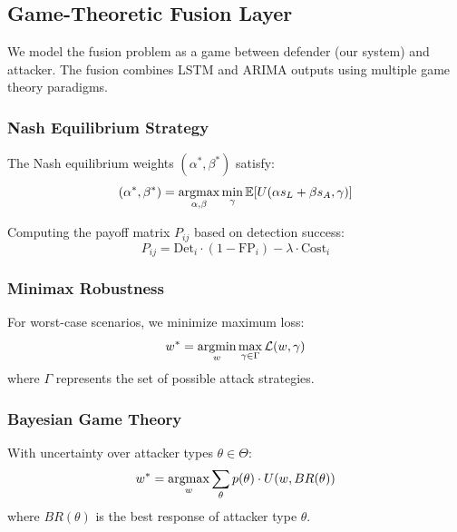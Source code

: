 \documentclass[10pt,conference]{IEEEtran}
\newcommand{\argmax}{\operatornamewithlimits{argmax}}
\newcommand{\argmin}{\operatornamewithlimits{argmin}}
\begin{document}
\subsection{Game-Theoretic Fusion Layer}

We model the fusion problem as a game between defender (our system) and attacker. The fusion combines LSTM and ARIMA outputs using multiple game theory paradigms.

\subsubsection{Nash Equilibrium Strategy}

The Nash equilibrium weights $(\alpha^*, \beta^*)$ satisfy:
\begin{equation}
(\alpha^*, \beta^*) = \argmax_{\alpha,\beta} \min_{\gamma} \mathbb{E}[U(\alpha s_L + \beta s_A, \gamma)]
\end{equation}

Computing the payoff matrix $P_{ij}$ based on detection success:
\begin{equation}
P_{ij} = \text{Det}_i \cdot (1 - \text{FP}_i) - \lambda \cdot \text{Cost}_i
\end{equation}

\subsubsection{Minimax Robustness}

For worst-case scenarios, we minimize maximum loss:
\begin{equation}
w^* = \argmin_w \max_{\gamma \in \Gamma} \mathcal{L}(w, \gamma)
\end{equation}
where $\Gamma$ represents the set of possible attack strategies.

\subsubsection{Bayesian Game Theory}

With uncertainty over attacker types $\theta \in \Theta$:
\begin{equation}
w^* = \argmax_w \sum_{\theta} p(\theta) \cdot U(w, BR(\theta))
\end{equation}
where $BR(\theta)$ is the best response of attacker type $\theta$.
\end{document}
